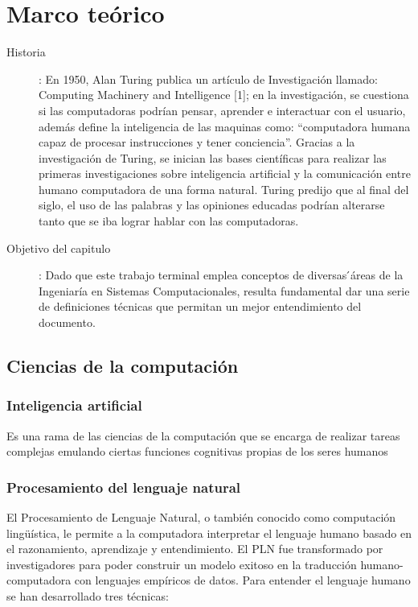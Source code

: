 \chapter{Marco teórico}
    \begin{description}
        \item [Historia]:
            En 1950, Alan Turing publica un artículo de Investigación llamado: Computing Machinery and Intelligence [1]; en la investigación, se cuestiona si las computadoras podrían pensar, aprender e interactuar con el usuario, además define la inteligencia de las maquinas como: “computadora humana capaz de procesar instrucciones y tener conciencia”. Gracias a la investigación de Turing, se inician las bases científicas para realizar las primeras investigaciones sobre inteligencia artificial y la comunicación entre humano computadora de una forma natural. Turing predijo que al final del siglo, el uso de las palabras y las opiniones educadas podrían alterarse tanto que se iba lograr hablar con las computadoras.
                
        \item [Objetivo del capitulo]:
            Dado que este trabajo terminal emplea conceptos de diversas ́áreas de la Ingeniaría en Sistemas Computacionales, resulta fundamental dar una serie de definiciones técnicas que permitan un mejor entendimiento del documento.
    \end{description}
        
    \section{Ciencias de la computación}
        
        \subsection{Inteligencia artificial}
        Es una rama de las ciencias de la computación que se encarga de realizar tareas complejas emulando ciertas funciones cognitivas propias de los seres humanos
        
        \subsection{Procesamiento del lenguaje natural}
                El Procesamiento de Lenguaje Natural, o también conocido como computación lingüística, le permite a la computadora interpretar el lenguaje humano basado en el razonamiento, aprendizaje y entendimiento. El PLN fue transformado por investigadores para poder construir un modelo exitoso en la traducción humano-computadora con lenguajes empíricos de datos. Para entender el lenguaje humano se han desarrollado tres técnicas:
                

